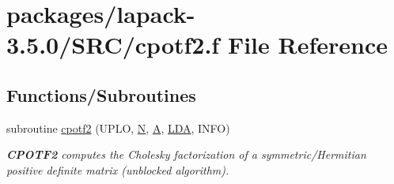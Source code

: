\hypertarget{cpotf2_8f}{}\section{packages/lapack-\/3.5.0/\+S\+R\+C/cpotf2.f File Reference}
\label{cpotf2_8f}
\subsection*{Functions/\+Subroutines}
\begin{DoxyCompactItemize}
\item 
subroutine \hyperlink{group__complexPOcomputational_ga56e13fb822ec7474402943652d7c93c6}{cpotf2} (U\+P\+L\+O, \hyperlink{polmisc_8c_a0240ac851181b84ac374872dc5434ee4}{N}, \hyperlink{classA}{A}, \hyperlink{example__user_8c_ae946da542ce0db94dced19b2ecefd1aa}{L\+D\+A}, I\+N\+F\+O)
\begin{DoxyCompactList}\small\item\em {\bfseries C\+P\+O\+T\+F2} computes the Cholesky factorization of a symmetric/\+Hermitian positive definite matrix (unblocked algorithm). \end{DoxyCompactList}\end{DoxyCompactItemize}
